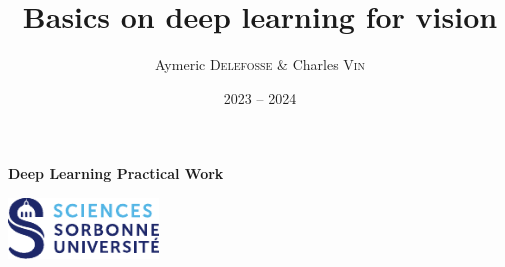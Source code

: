 \documentclass{report}
\title{Basics on deep learning for vision}
\author{Aymeric \textsc{Delefosse} \& Charles \textsc{Vin}}
\date{2023 -- 2024}
\theoremstyle{plain}%
\theoremstyle{definition}
\theoremstyle{remark}
\begin{document}
\begin{titlepage}
    \centering
    
    \vspace*{\fill}
    \Huge \thetitle \par
    \vspace{2mm}
    \Large \textbf{Deep Learning Practical Work} \par
    \vspace{2mm}

    \Large \theauthor \par
    \vspace{2mm}
    \large \thedate \par
    
    \vfill
    
    \includegraphics[width=0.3\textwidth]{../figs/sorbonne-science.pdf}
    
\end{titlepage}

\tableofcontents
\newpage





\end{document}

